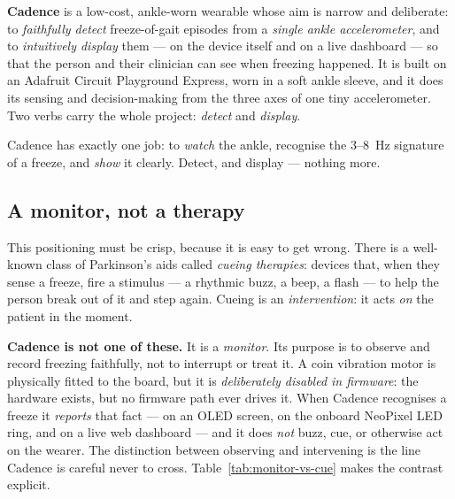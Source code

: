 \textbf{Cadence} is a low-cost, ankle-worn wearable whose aim is narrow and deliberate:
to \emph{faithfully detect} freeze-of-gait episodes from a \emph{single ankle
accelerometer}, and to \emph{intuitively display} them --- on the device itself and on a
live dashboard --- so that the person and their clinician can see when freezing happened.
It is built on an Adafruit Circuit Playground Express, worn in a soft ankle sleeve, and
it does its sensing and decision-making from the three axes of one tiny accelerometer.
Two verbs carry the whole project: \emph{detect} and \emph{display}.

\begin{takeaway}
Cadence has exactly one job: to \emph{watch} the ankle, recognise the
\SI{3}{}--\SI{8}{\hertz} signature of a freeze, and \emph{show} it clearly. Detect, and
display --- nothing more.
\end{takeaway}

\subsection{A monitor, not a therapy}

This positioning must be crisp, because it is easy to get wrong. There is a well-known
class of Parkinson's aids called \emph{cueing therapies}: devices that, when they sense
a freeze, fire a stimulus --- a rhythmic buzz, a beep, a flash --- to help the person
break out of it and step again. Cueing is an \emph{intervention}: it acts \emph{on} the
patient in the moment.

\textbf{Cadence is not one of these.} It is a \emph{monitor}. Its purpose is to observe
and record freezing faithfully, not to interrupt or treat it. A coin vibration motor is
physically fitted to the board, but it is \emph{deliberately disabled in firmware}: the
hardware exists, but no firmware path ever drives it. When Cadence recognises a freeze it
\emph{reports} that fact --- on an OLED screen, on the onboard NeoPixel LED ring, and on
a live web dashboard --- and it does \emph{not} buzz, cue, or otherwise act on the wearer.
The distinction between observing and intervening is the line Cadence is careful never to
cross. Table~\ref{tab:monitor-vs-cue} makes the contrast explicit.

